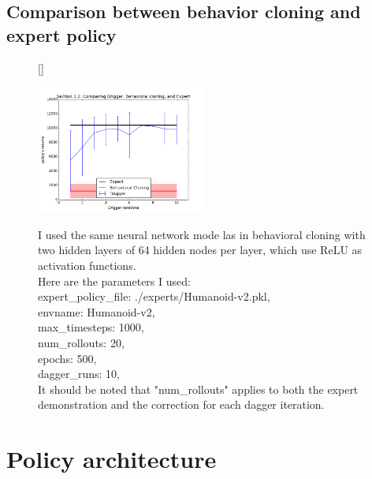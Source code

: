 \documentclass[12pt]{article}
\begin{document}
	\subsection{Comparison between behavior cloning and expert policy}
	\begin{figure}[!htbp] 
		[\FBwidth]
		{\caption[caption]{
				I used the same neural network mode las in behavioral cloning with two hidden layers of 64 hidden nodes per layer, which use ReLU as activation functions.\\ \hspace{0.5\textwidth}
				Here are the parameters I used:\\ \hspace{0.5\textwidth}
				expert\_policy\_file: ./experts/Humanoid-v2.pkl,\\ \hspace{0.5\textwidth}
				envname: Humanoid-v2,\\ \hspace{0.5\textwidth}
				max\_timesteps: 1000,\\ \hspace{0.5\textwidth}
				num\_rollouts: 20,\\ \hspace{0.5\textwidth}
				epochs: 500,\\ \hspace{0.5\textwidth}
				dagger\_runs: 10, \\ \hspace{0.5\textwidth}
				It should be noted that "num\_rollouts" applies to both the expert demonstration and the correction for each dagger iteration.
			}\label{fig:dagger}}
		{\includegraphics[width=0.5\textwidth]{section32.png}}
	\end{figure}
	
	\section{Policy architecture}
\end{document}
